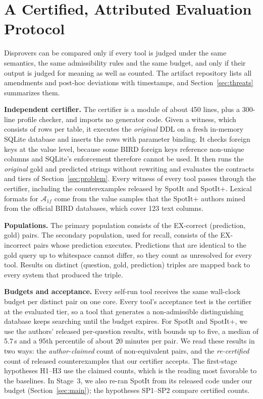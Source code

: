 \section{A Certified, Attributed Evaluation Protocol}\label{sec:protocol}

Disprovers can be compared only if every tool is judged under the same semantics, the same admissibility rules and the same budget, and only if their output is judged for meaning as well as counted. The artifact repository lists all amendments and post-hoc deviations with timestamps, and Section~\ref{sec:threats} summarizes them.

\textbf{Independent certifier.} The certifier is a module of about 450 lines, plus a 300-line profile checker, and imports no generator code. Given a witness, which consists of rows per table, it executes the \emph{original} DDL on a fresh in-memory SQLite database and inserts the rows with parameter binding. It checks foreign keys at the value level, because some BIRD foreign keys reference non-unique columns and SQLite's enforcement therefore cannot be used. It then runs the \emph{original} gold and predicted strings without rewriting and evaluates the contracts and tiers of Section~\ref{sec:problem}. Every witness of every tool passes through the certifier, including the counterexamples released by SpotIt and SpotIt+. Lexical formats for $\mathcal A_{1f}$ come from the value samples that the SpotIt+ authors mined from the official BIRD databases, which cover 123 text columns.

\textbf{Populations.} The primary population consists of the EX-correct (prediction, gold) pairs. The secondary population, used for recall, consists of the EX-incorrect pairs whose prediction executes. Predictions that are identical to the gold query up to whitespace cannot differ, so they count as unresolved for every tool. Results on distinct (question, gold, prediction) triples are mapped back to every system that produced the triple.

\textbf{Budgets and acceptance.} Every self-run tool receives the same wall-clock budget per distinct pair on one core. Every tool's acceptance test is the certifier at the evaluated tier, so a tool that generates a non-admissible distinguishing database keeps searching until the budget expires. For SpotIt and SpotIt+, we use the authors' released per-question results, with bounds up to five, a median of 5.7\,s and a 95th percentile of about 20 minutes per pair. We read these results in two ways: the \emph{author-claimed} count of non-equivalent pairs, and the \emph{re-certified} count of released counterexamples that our certifier accepts. The first-stage hypotheses H1--H3 use the claimed counts, which is the reading most favorable to the baselines. In Stage~3, we also re-ran SpotIt from its released code under our budget (Section~\ref{sec:main}); the hypotheses SP1--SP2 compare certified counts.

